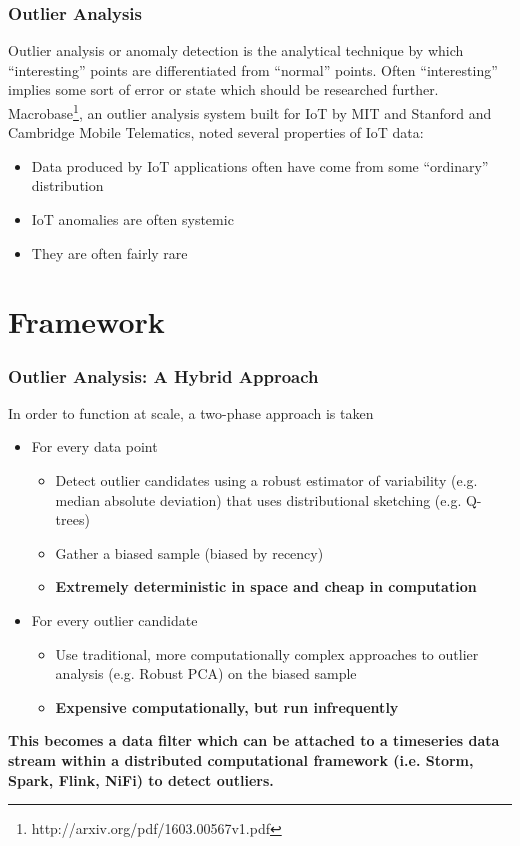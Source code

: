 \documentclass{beamer}
\begin{document}
\begin{frame}
\frametitle{Outlier Analysis}
Outlier analysis or anomaly detection is the analytical technique by which ``interesting'' points are differentiated from ``normal'' points.  Often ``interesting'' implies some sort of error or state which should be researched further.\pause
\\
Macrobase\footnote{http://arxiv.org/pdf/1603.00567v1.pdf}, an outlier analysis system built for IoT by MIT and Stanford and Cambridge Mobile Telematics, noted several properties of IoT data:
\begin{itemize}
\item Data produced by IoT applications often have come from some ``ordinary'' distribution
\item IoT anomalies are often systemic
\item They are often fairly rare
\end{itemize}
\end{frame}

\section{Framework}

\begin{frame}
\frametitle{Outlier Analysis: A Hybrid Approach}
In order to function at scale, a two-phase approach is taken
\begin{itemize}
\item For every data point\pause
  \begin{itemize}
  \item Detect outlier candidates using a robust estimator of variability (e.g. median absolute deviation) that uses distributional sketching (e.g. Q-trees)
  \item Gather a biased sample (biased by recency)\pause
  \item {\bf Extremely deterministic in space and cheap in computation}\pause
  \end{itemize}
\item For every outlier candidate
  \begin{itemize}
  \item Use traditional, more computationally complex approaches to outlier analysis (e.g. Robust PCA) on the biased sample\pause
  \item {\bf Expensive computationally, but run infrequently}\pause
  \end{itemize}
\end{itemize}
{\bf This becomes a data filter which can be attached to a timeseries 
data stream within a distributed computational framework (i.e. Storm, Spark, Flink, NiFi) to detect outliers.}
\end{frame}
\end{document}
